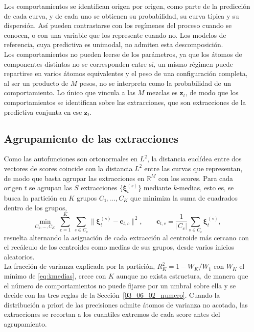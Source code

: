 Los comportamientos se identifican origen por origen, como parte de la predicción de cada curva, y de cada uno se obtienen su probabilidad, su curva típica y su dispersión. Así pueden contrastarse con los regímenes del proceso cuando se conocen, o con una variable que los represente cuando no. Los modelos de referencia, cuya predictiva es unimodal, no admiten esta descomposición.\\

Los comportamientos no pueden leerse de los parámetros, ya que los átomos de componentes distintas no se corresponden entre sí, un mismo régimen puede repartirse en varios átomos equivalentes y el peso de una configuración completa, al ser un producto de $M$ pesos, no se interpreta como la probabilidad de un comportamiento. Lo único que vincula a las $M$ mezclas es $\mathbf{z}_t$, de modo que los comportamientos se identifican sobre las extracciones, que son extracciones de la predictiva conjunta en ese $\mathbf{z}_t$. 
 
\subsection{Agrupamiento de las extracciones}
\label{03_06_01_agrupamiento}

Como las autofunciones son ortonormales en $L^2$, la distancia euclídea entre dos vectores de scores coincide con la distancia $L^2$ entre las curvas que representan, de modo que basta agrupar las extracciones en $\mathbb{R}^{M}$ con los scores. Para cada origen $t$ se agrupan las $S$ extracciones $\{\boldsymbol{\xi}_t^{(s)}\}$ mediante $k$-medias, esto es, se busca la partición en $K$ grupos $C_1, \dots, C_K$ que minimiza la suma de cuadrados dentro de los grupos,
\begin{equation}\label{eq:kmedias}
    \min_{C_1, \dots, C_K}\ \sum_{c=1}^{K}\ \sum_{s \in C_c} \bigl\lVert \boldsymbol{\xi}_t^{(s)} - \mathbf{c}_{t,c} \bigr\rVert^{2},
    \qquad
    \mathbf{c}_{t,c} = \frac{1}{\lvert C_c \rvert}\sum_{s \in C_c} \boldsymbol{\xi}_t^{(s)},
\end{equation}
resuelta alternando la asignación de cada extracción al centroide más cercano con el recálculo de los centroides como medias de sus grupos, desde varios inicios aleatorios.\\

La fracción de varianza explicada por la partición, $R^2_K = 1 - W_K / W_1$ con $W_K$ el mínimo de \eqref{eq:kmedias}, crece con $K$ aunque no exista estructura, de manera que el número de comportamientos no puede fijarse por un umbral sobre ella y se decide con las tres reglas de la Sección~\ref{03_06_02_numero}. Cuando la distribución a priori de las precisiones admite átomos de varianza no acotada, las extracciones se recortan a los cuantiles extremos de cada score antes del agrupamiento.

